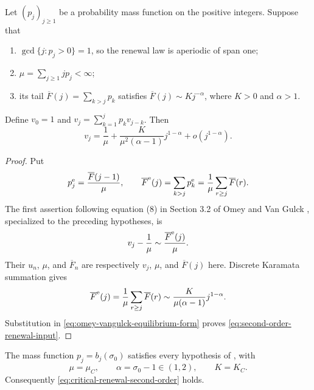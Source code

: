 \begin{lemma}
\label{lem:second-order-lattice-renewal}
Let \((p_j)_{j\ge1}\) be a probability mass function on the positive
integers.  Suppose that
\begin{enumerate}
 \item \(\gcd\{j:p_j>0\}=1\), so the renewal law is aperiodic of span one;
 \item \(\mu=\sum_{j\ge1}jp_j<\infty\);
 \item its tail \(\overline F(j)=\sum_{k>j}p_k\) satisfies
 \(\overline F(j)\sim Kj^{-\alpha}\), where \(K>0\) and
 \(\alpha>1\).
\end{enumerate}
Define \(v_0=1\) and
\(v_j=\sum_{k=1}^jp_kv_{j-k}\).  Then
\begin{equation}
 v_j=\frac1\mu+\frac{K}{\mu^2(\alpha-1)}j^{1-\alpha}
      +o(j^{1-\alpha}).
 \label{eq:second-order-renewal-input}
\end{equation}
\end{lemma}

\begin{proof}
Put
\[
 p^{\rm e}_j=\frac{\overline F(j-1)}\mu,
 \qquad
 \overline F^{\rm e}(j)
 =\sum_{k>j}p^{\rm e}_k
 =\frac1\mu\sum_{r\ge j}\overline F(r).
\]
The first assertion following equation (8) in Section 3.2 of Omey and Van
Gulck \cite{OmeyVanGulck2015}, specialized to the preceding hypotheses, is
\begin{equation}
 v_j-\frac1\mu\sim\frac{\overline F^{\rm e}(j)}\mu.
 \label{eq:omey-vangulck-equilibrium-form}
\end{equation}
Their \(u_n\), \(\mu\), and \(\overline F_n\) are respectively \(v_j\),
\(\mu\), and \(\overline F(j)\) here.  Discrete Karamata summation gives
\[
 \overline F^{\rm e}(j)
 =\frac1\mu\sum_{r\ge j}\overline F(r)
 \sim\frac{K}{\mu(\alpha-1)}j^{1-\alpha}.
\]
Substitution in \eqref{eq:omey-vangulck-equilibrium-form} proves
\eqref{eq:second-order-renewal-input}.
\end{proof}

\begin{proposition}
\label{prop:critical-renewal-hypotheses}
The mass function \(p_j=b_j(\sigma_0)\) satisfies every hypothesis of
, with
\[
 \mu=\mu_C,\qquad \alpha=\sigma_0-1\in(1,2),\qquad K=K_C.
\]
Consequently \eqref{eq:critical-renewal-second-order} holds.
\end{proposition}

